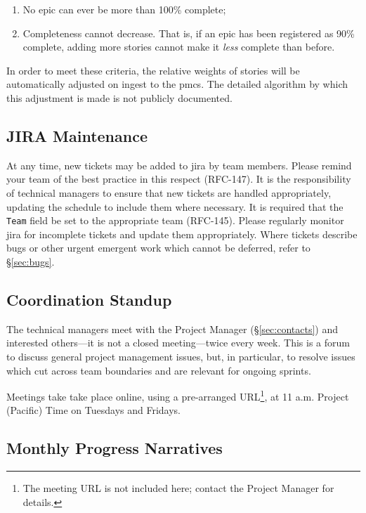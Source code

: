 \begin{enumerate}
\item
  No \gls{epic} can ever be more than 100\% complete;
\item
  Completeness cannot decrease.
  That is, if an \gls{epic} has been registered as 90\% complete, adding more stories cannot make it \emph{less} complete than before.
\end{enumerate}

In order to meet these criteria, the relative weights of stories will be automatically adjusted on ingest to the \gls{pmcs}.
The detailed algorithm by which this adjustment is made is not publicly documented.

\subsection{JIRA Maintenance}
\label{sec:jira-maintenance}

At any time, new tickets may be added to \gls{jira} by team members.
Please remind your team of the best practice in this respect (RFC-147).
It is the responsibility of technical managers to ensure that new tickets are handled appropriately, updating the schedule to include them where necessary.
It is required that the \texttt{Team} field be set to the appropriate team (RFC-145).
Please regularly monitor \gls{jira} for incomplete tickets and update them appropriately.
Where tickets describe bugs or other urgent emergent work which cannot be deferred, refer to \S\ref{sec:bugs}.

\subsection{Coordination Standup}
\label{sec:sup}

The technical managers meet with the Project Manager (\S\ref{sec:contacts}) and interested others---it is not a closed meeting---twice every week.
This is a forum to discuss general project management issues, but, in particular, to resolve issues which cut across team boundaries and are relevant for ongoing sprints.

Meetings take take place online, using a pre-arranged URL\footnote{The meeting URL is not included here; contact the Project Manager for details.}, at 11 a.m. Project (Pacific) Time on Tuesdays and Fridays.

\subsection{Monthly Progress Narratives}
\label{sec:monthly-narrative}

